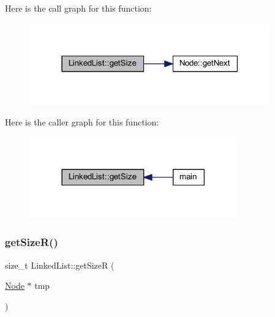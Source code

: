 Here is the call graph for this function\+:
\nopagebreak
\begin{figure}[H]
\begin{center}
\leavevmode
\includegraphics[width=295pt]{class_linked_list_ac8d24166208694f4fe3cc982307b03fb_cgraph}
\end{center}
\end{figure}
Here is the caller graph for this function\+:
\nopagebreak
\begin{figure}[H]
\begin{center}
\leavevmode
\includegraphics[width=254pt]{class_linked_list_ac8d24166208694f4fe3cc982307b03fb_icgraph}
\end{center}
\end{figure}
\mbox{\label{class_linked_list_af4b27646ebfb44d2fd0625b8ad1fb136}} 
\subsubsection{\texorpdfstring{get\+Size\+R()}{getSizeR()}}
{\footnotesize\ttfamily size\+\_\+t Linked\+List\+::get\+SizeR (\begin{DoxyParamCaption}\item[{\hyperlink{class_node}{Node} $\ast$}]{tmp }\end{DoxyParamCaption})}

